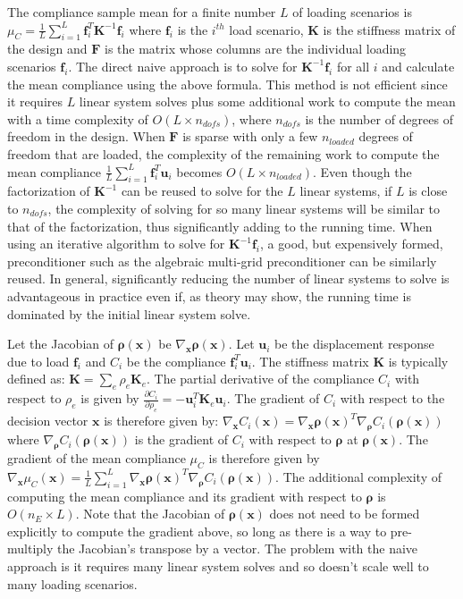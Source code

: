     The compliance sample mean for a finite number $L$ of loading scenarios is $\mu_C = \frac{1}{L} \sum_{i=1}^L \bm{f}_i^T \bm{K}^{-1} \bm{f}_i$ where $\bm{f}_i$ is the $i^{th}$ load scenario, $\bm{K}$ is the stiffness matrix of the design and $\bm{F}$ is the matrix whose columns are the individual loading scenarios $\bm{f}_i$. The direct naive approach is to solve for $\bm{K}^{-1} \bm{f}_i$ for all $i$ and calculate the mean compliance using the above formula. This method is not efficient since it requires $L$ linear system solves plus some additional work to compute the mean with a time complexity of $O(L \times n_{dofs})$, where $n_{dofs}$ is the number of degrees of freedom in the design. When $\bm{F}$ is sparse with only a few $n_{loaded}$ degrees of freedom that are loaded, the complexity of the remaining work to compute the mean compliance $\frac{1}{L} \sum_{i=1}^L \bm{f}_i^T \bm{u}_i$ becomes $O(L \times n_{loaded})$. Even though the factorization of $\bm{K}^{-1}$ can be reused to solve for the $L$ linear systems, if $L$ is close to $n_{dofs}$, the complexity of solving for so many linear systems will be similar to that of the factorization, thus significantly adding to the running time. When using an iterative algorithm to solve for $\bm{K}^{-1}\bm{f}_i$, a good, but expensively formed, preconditioner such as the algebraic multi-grid preconditioner can be similarly reused. In general, significantly reducing the number of linear systems to solve is advantageous in practice even if, as theory may show, the running time is dominated by the initial linear system solve.

    Let the Jacobian of $\bm{\rho}(\bm{x})$ be $\nabla_{\bm{x}} \bm{\rho}(\bm{x})$. Let $\bm{u}_i$ be the displacement response due to load $\bm{f}_i$ and $C_i$ be the compliance $\bm{f}_i^T \bm{u}_i$. The stiffness matrix $\bm{K}$ is typically defined as: $\bm{K} = \sum_e \rho_e \bm{K}_e$. The partial derivative of the compliance $C_i$ with respect to $\rho_e$ is given by $\frac{\partial C_i}{\partial \rho_e} = -\bm{u}_i^T \bm{K}_e \bm{u}_i$. The gradient of $C_i$ with respect to the decision vector $\bm{x}$ is therefore given by: $\nabla_{\bm{x}} C_i(\bm{x}) = \nabla_{\bm{x}} \bm{\rho}(\bm{x})^T \nabla_{\bm{\rho}} C_i(\bm{\rho}(\bm{x}))$ where $\nabla_{\bm{\rho}} C_i(\bm{\rho}(\bm{x}))$ is the gradient of $C_i$ with respect to $\bm{\rho}$ at $\bm{\rho}(\bm{x})$. The gradient of the mean compliance $\mu_C$ is therefore given by $\nabla_{\bm{x}} \mu_C(\bm{x}) = \frac{1}{L} \sum_{i=1}^L \nabla_{\bm{x}} \bm{\rho}(\bm{x})^T \nabla_{\bm{\rho}} C_i(\bm{\rho}(\bm{x}))$. The additional complexity of computing the mean compliance and its gradient with respect to $\bm{\rho}$ is $O(n_E \times L)$. Note that the Jacobian of $\bm{\rho}(\bm{x})$ does not need to be formed explicitly to compute the gradient above, so long as there is a way to pre-multiply the Jacobian's transpose by a vector. The problem with the naive approach is it requires many linear system solves and so doesn't scale well to many loading scenarios.

